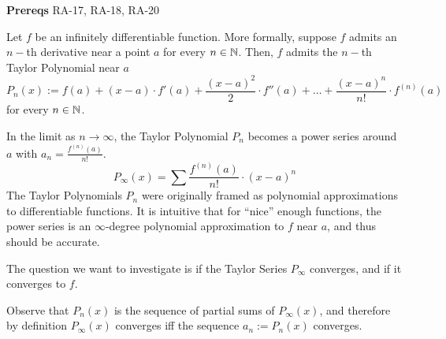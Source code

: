 

\textbf{Prereqs} RA-17, RA-18, RA-20

Let $f$ be an infinitely differentiable function. More formally, suppose $f$ admits an $n-$th derivative near a point $a$ for every $n \in \mathbb{N}$. Then, $f$ admits the $n-$th Taylor Polynomial near $a$
$$
P_n(x) := f(a) + (x - a)\cdot f'(a) + \dfrac{(x - a)^2}{2}\cdot f''(a) + \dots + \dfrac{(x - a)^n}{n!}\cdot f^{(n)}(a)
$$
for every $n \in \mathbb{N}$.

In the limit as $n\to \infty$, the Taylor Polynomial $P_n$ becomes a power series around $a$ with $a_n = \frac{f^{(n)}(a)}{n!}$.
$$
P_{\infty}(x) = \sum \dfrac{f^{(n)}(a)}{n!} \cdot (x - a)^n
$$
The Taylor Polynomials $P_n$ were originally framed as polynomial approximations to differentiable functions. It is intuitive that for ``nice'' enough functions, the power series is an $\infty$-degree polynomial approximation to $f$ near $a$, and thus should be accurate.

The question we want to investigate is if the Taylor Series $P_\infty$ converges, and if it converges to $f$.

Observe that $P_n(x)$ is the sequence of partial sums of $P_\infty(x)$, and therefore by definition $P_\infty(x)$ converges iff the sequence $a_n := P_n(x)$ converges.

